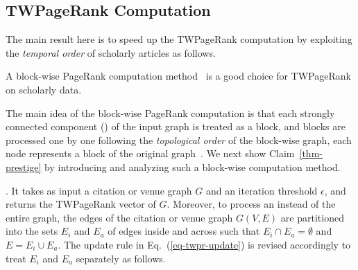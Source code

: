 



\subsection{TWPageRank Computation}
\label{subsec-TWPageRank-computation}

The main result here is to speed up the TWPageRank computation by exploiting the {\em temporal order} of scholarly articles as follows.


\begin{claim}
\label{thm-prestige}
A block-wise PageRank computation method~\cite{Berkhin05} is a good choice for TWPageRank on scholarly data.
\end{claim}

The main idea of the block-wise PageRank computation is that each strongly connected component (\scc) of the input graph is treated as a block, and blocks are processed one by one following the {\em topological order} of the block-wise graph, \ie each node represents a block of the original graph~\cite{Berkhin05}.
We next show Claim~\ref{thm-prestige} by introducing and analyzing such a block-wise computation method.




.  It takes as input a citation or venue graph $G$ and an iteration threshold $\epsilon$, and returns the TWPageRank vector of $G$.
Moreover, to process an \scc instead of the entire graph, the edges of the citation or venue graph $G(V, E)$ are partitioned into the sets $E_i$ and $E_a$ of edges inside and across \sccs  such that $E_i\cap E_a = \emptyset$ and $E = E_i \cup E_a$.  The update rule in Eq.~(\ref{eq-twpr-update})  is revised accordingly to treat $E_i$ and $E_a$ separately as follows.

